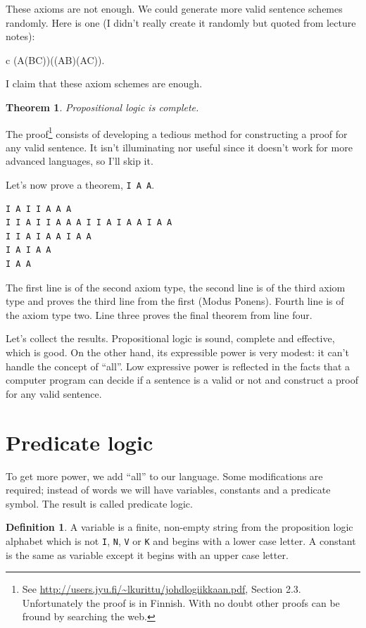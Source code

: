 \documentclass[11pt,oneside,%
]{memoir}
\newenvironment{eqna}{\begin{IEEEeqnarray}{c}}{\end{IEEEeqnarray}\ignorespacesafterend}
\newtheorem{teoreema}{Theorem}
\theoremstyle{definition}
\newtheorem{maaritelma}{Definition}
\newcommand{\propositio}{\lstinline[language=propositio]}
\newcommand{\joukk}{\lstinline[language=joukko]}
\begin{document}
These axioms are not enough. We could generate more valid sentence schemes randomly. Here is one (I didn't really create it randomly but quoted from lecture notes):
\begin{eqna}
    (A\rightarrow(B\rightarrow C))\rightarrow((A\rightarrow B)\rightarrow(A\rightarrow C)).
\end{eqna}
I claim that these axiom schemes are enough.
\begin{teoreema}
Propositional logic is complete.
\end{teoreema}
The proof\footnote{See \url{http://users.jyu.fi/~lkurittu/johdlogiikkaan.pdf}, Section 2.3. Unfortunately the proof is in Finnish. With no doubt other proofs can be fround by searching the web.} consists of developing a tedious method for constructing a proof for any valid sentence. It isn't illuminating nor useful since it doesn't work for more advanced languages, so I'll skip it.

Let's now prove a theorem, \propositio!I A A!.
\begin{lstlisting}[language=propositio]
I A I I A A A
I I A I I A A A I I A I A A I A A
I I A I A A I A A
I A I A A
I A A
\end{lstlisting}
The first line is of the second axiom type, the second line is of the third axiom type and proves the third line from the first (Modus Ponens). Fourth line is of the axiom type two. Line three proves the final theorem from line four.

Let's collect the results. Propositional logic is sound, complete and effective, which is good. On the other hand, its expressible power is very modest: it can't handle the concept of ``all''. Low expressive power is reflected in the facts that a computer program can decide if a sentence is a valid or not and construct a proof for any valid sentence.

\section{Predicate logic}

To get more power, we add ``all'' to our language. Some modifications are required; instead of words we will have variables, constants and a predicate symbol. The result is called predicate logic.

\begin{maaritelma}
A variable is a finite, non-empty string from the proposition logic alphabet which is not \joukk!I!, \joukk!N!, \joukk!V! or \joukk!K! and begins with a lower case letter. A constant is the same as variable except it begins with an upper case letter.
\end{maaritelma}
\end{document}
